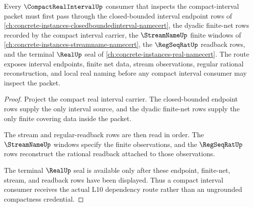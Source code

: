 \begin{theorem}
\label{thm:compact-real-interval-closed-bounded-route}
Every $\CompactRealIntervalUp$ consumer that inspects the compact-interval packet must first pass through the closed-bounded interval endpoint rows of \autoref{ch:concrete-instances-closedboundedinterval-namecert}, the dyadic finite-net rows recorded by the compact interval carrier, the $\StreamNameUp$ finite windows of \autoref{ch:concrete-instances-streamname-namecert}, the $\RegSeqRatUp$ readback rows, and the terminal $\RealUp$ seal of \autoref{ch:concrete-instances-real-namecert}. The route exposes interval endpoints, finite net data, stream observations, regular rational reconstruction, and local real naming before any compact interval consumer may inspect the packet.
\end{theorem}
\begin{proof}
Project the compact real interval carrier. The closed-bounded endpoint rows supply the only interval source, and the dyadic finite-net rows supply the only finite covering data inside the packet.

The stream and regular-readback rows are then read in order. The $\StreamNameUp$ windows specify the finite observations, and the $\RegSeqRatUp$ rows reconstruct the rational readback attached to those observations.

The terminal $\RealUp$ seal is available only after these endpoint, finite-net, stream, and readback rows have been displayed. Thus a compact interval consumer receives the actual L10 dependency route rather than an ungrounded compactness credential.
\end{proof}
